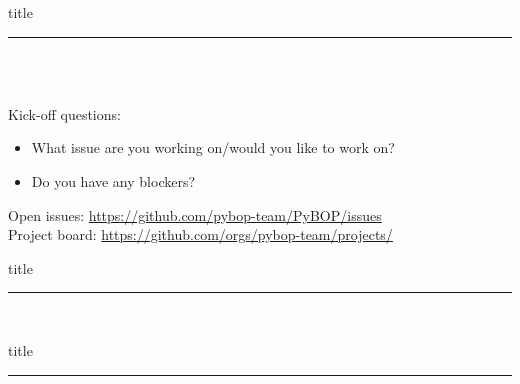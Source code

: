 \documentclass[aspectratio=169]{beamer}
\begin{document}
\begin{frame}[plain]
    \centering
    \begin{beamercolorbox}[sep=8pt,center,shadow=true,rounded=true]{title}
    \par%
    \color{oxfordblue}\noindent\rule{10cm}{1pt} \\
    \LARGE{\faUserPlus} \LARGE{\faBug} \\
    \normalsize
    \begin{flushleft}
        Kick-off questions:
    \end{flushleft}
    \begin{itemize}
        \item What issue are you working on/would you like to work on?
        \item Do you have any blockers?
    \end{itemize}
    \vspace{6mm} \normalsize
    Open issues: \href{https://github.com/pybop-team/PyBOP/issues}{https://github.com/pybop-team/PyBOP/issues} \\
    Project board: \href{https://github.com/orgs/pybop-team/projects/}{https://github.com/orgs/pybop-team/projects/}
    \end{beamercolorbox}
\end{frame}

\begin{frame}[plain]
    \centering
    \begin{beamercolorbox}[sep=8pt,center,shadow=true,rounded=true]{title}
    \par%
    \color{oxfordblue}\noindent\rule{10cm}{1pt} \\
    \end{beamercolorbox}
\end{frame}

\begin{frame}[plain]
    \centering
    \begin{beamercolorbox}[sep=8pt,center,shadow=true,rounded=true]{title}
    \par%
    \color{oxfordblue}\noindent\rule{10cm}{1pt} \\
    \end{beamercolorbox}
\end{frame}

\end{document}
